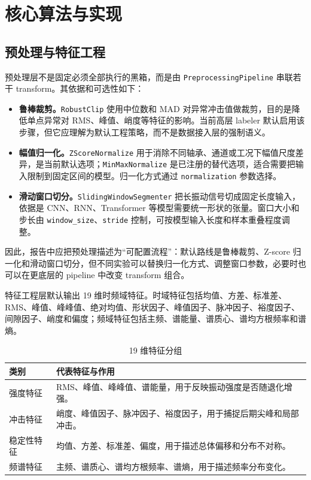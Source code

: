 \documentclass[UTF8,a4paper,12pt]{ctexart}
\newcommand{\code}[1]{\texttt{#1}}
\begin{document}
\section{核心算法与实现}

\subsection{预处理与特征工程}

预处理层不是固定必须全部执行的黑箱，而是由 \code{PreprocessingPipeline} 串联若干 transform。其依据和可选性如下：

\begin{itemize}
  \item \textbf{鲁棒裁剪。}\code{RobustClip} 使用中位数和 MAD 对异常冲击值做裁剪，目的是降低单点异常对 RMS、峰值、峭度等特征的影响。当前高层 labeler 默认启用该步骤，但它应理解为默认工程策略，而不是数据接入层的强制语义。
  \item \textbf{幅值归一化。}\code{ZScoreNormalize} 用于消除不同轴承、通道或工况下幅值尺度差异，是当前默认选项；\code{MinMaxNormalize} 是已注册的替代选项，适合需要把输入限制到固定区间的模型。归一化方式通过 \code{normalization} 参数选择。
  \item \textbf{滑动窗口切分。}\code{SlidingWindowSegmenter} 把长振动信号切成固定长度输入，依据是 CNN、RNN、Transformer 等模型需要统一形状的张量。窗口大小和步长由 \code{window\_size}、\code{stride} 控制，可按模型输入长度和样本重叠程度调整。
\end{itemize}

因此，报告中应把预处理描述为“可配置流程”：默认路线是鲁棒裁剪、Z-score 归一化和滑动窗口切分，但不同实验可以替换归一化方式、调整窗口参数，必要时也可以在更底层的 pipeline 中改变 transform 组合。

特征工程层默认输出 19 维时频域特征。时域特征包括均值、方差、标准差、RMS、峰值、峰峰值、绝对均值、形状因子、峰值因子、脉冲因子、裕度因子、间隙因子、峭度和偏度；频域特征包括主频、谱能量、谱质心、谱均方根频率和谱熵。

\begin{table}[H]
\centering
\caption{19 维特征分组}
\begin{tabularx}{\textwidth}{p{2.8cm}Y}
\toprule
类别 & 代表特征与作用 \\
\midrule
强度特征 & RMS、峰值、峰峰值、谱能量，用于反映振动强度是否随退化增强。 \\
冲击特征 & 峭度、峰值因子、脉冲因子、裕度因子，用于捕捉后期尖峰和局部冲击。 \\
稳定性特征 & 均值、方差、标准差、偏度，用于描述总体偏移和分布不对称。 \\
频谱特征 & 主频、谱质心、谱均方根频率、谱熵，用于描述频率分布变化。 \\
\bottomrule
\end{tabularx}
\end{table}
\end{document}

